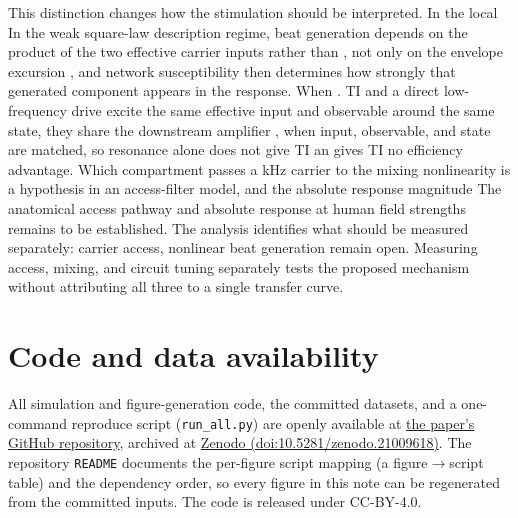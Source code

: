 \documentclass[11pt,a4paper]{article}
\providecommand{\DIFaddtex}[1]{{\protect\color{blue} \sf #1}} %
\providecommand{\DIFdeltex}[1]{{\protect\color{red} \scriptsize #1}} %
\providecommand{\DIFaddbegin}{} %
\providecommand{\DIFaddend}{} %
\providecommand{\DIFdelbegin}{} %
\providecommand{\DIFdelend}{} %
\providecommand{\DIFadd}[1]{\texorpdfstring{\DIFaddtex{#1}}{#1}} %
\providecommand{\DIFdel}[1]{\texorpdfstring{\DIFdeltex{#1}}{}} %
\begin{document}
\DIFdelbegin \DIFdel{This distinction changes how the stimulation should be interpreted. In the local
}\DIFdelend \DIFaddbegin \DIFadd{In the weak }\DIFaddend square-law \DIFdelbegin \DIFdel{description}\DIFdelend \DIFaddbegin \DIFadd{regime}\DIFaddend , beat generation depends on the product of the
\DIFdelbegin \DIFdel{two }\DIFdelend effective carrier inputs\DIFdelbegin \DIFdel{rather than }\DIFdelend \DIFaddbegin \DIFadd{, not }\DIFaddend only on the envelope excursion\DIFdelbegin \DIFdel{, and network susceptibility then
determines how strongly that generated component appears in the response. When }\DIFdelend \DIFaddbegin \DIFadd{. }\DIFaddend TI and a direct
low-frequency drive \DIFdelbegin \DIFdel{excite the same effective input and observable around the same
state, they }\DIFdelend share the downstream amplifier \DIFdelbegin \DIFdel{, }\DIFdelend \DIFaddbegin \DIFadd{when input, observable, and
state are matched, }\DIFaddend so resonance alone \DIFdelbegin \DIFdel{does not give TI an
}\DIFdelend \DIFaddbegin \DIFadd{gives TI no }\DIFaddend efficiency advantage. \DIFdelbegin \DIFdel{Which compartment passes a kHz carrier to the mixing nonlinearity is
a hypothesis in an access-filter model, and the absolute response magnitude }\DIFdelend \DIFaddbegin \DIFadd{The
anatomical access pathway and absolute response }\DIFaddend at human field strengths \DIFdelbegin \DIFdel{remains to be established. The analysis identifies what should be measured
separately: carrier access, nonlinear beat generation}\DIFdelend \DIFaddbegin \DIFadd{remain
open. Measuring access, mixing}\DIFaddend , and circuit tuning \DIFaddbegin \DIFadd{separately tests the proposed
mechanism without attributing all three to a single transfer curve}\DIFaddend .

\section*{Code and data availability}
All simulation and figure-generation code, the committed datasets, and a one-command
reproduce script (\texttt{run\_all.py}) are openly available at
\DIFdelbegin %
\DIFdelend \DIFaddbegin \href{https://github.com/giulioruffini/TI-demodulation-paper}{\DIFadd{the paper's GitHub repository}}\DIFaddend , archived at
\href{https://doi.org/10.5281/zenodo.21009618}{Zenodo (doi:10.5281/zenodo.21009618)}.
The repository \texttt{README} documents the per-figure script mapping (a
figure$\rightarrow$script table) and the dependency order, so every figure in this note can
be regenerated from the committed inputs. The code is released under CC-BY-4.0.
\end{document}
